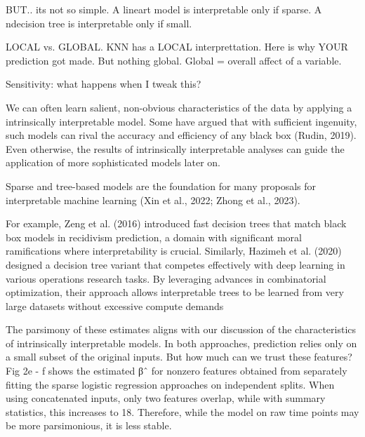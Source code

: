 BUT.. its not so simple. A lineart model is interpretable only if sparse. A ndecision tree is interpretable only if small. 

LOCAL vs. GLOBAL. KNN has a LOCAL interprettation. Here is why YOUR prediction got made. But nothing global. Global = overall affect of a variable. 

Sensitivity: what happens when I tweak this? 

We can often learn salient, non-obvious characteristics of the data by applying a intrinsically
interpretable model. Some have argued that with sufficient ingenuity, such models can rival the
accuracy and efficiency of any black box (Rudin, 2019). Even otherwise, the results of intrinsically
interpretable analyses can guide the application of more sophisticated models later on.


Sparse and tree-based models are the foundation for many proposals for interpretable machine
learning (Xin et al., 2022; Zhong et al., 2023). 

For example, Zeng et al. (2016) introduced fast
decision trees that match black box models in recidivism prediction, a domain with significant
moral ramifications where interpretability is crucial. Similarly, Hazimeh et al. (2020) designed a
decision tree variant that competes effectively with deep learning in various operations research
tasks. By leveraging advances in combinatorial optimization, their approach allows interpretable
trees to be learned from very large datasets without excessive compute demands

The parsimony of these estimates aligns with our discussion of the characteristics of intrinsically interpretable models. In both approaches, prediction relies only on a small subset of the
original inputs. But how much can we trust these features? Fig 2e - f shows the estimated βˆ
for nonzero features obtained from separately fitting the sparse logistic regression approaches
on independent splits. When using concatenated inputs, only two features overlap, while with
summary statistics, this increases to 18. Therefore, while the model on raw time points may be
more parsimonious, it is less stable.